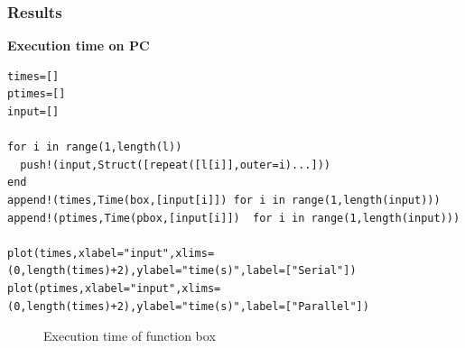 \documentclass[a4paper,12pt]{article}
\begin{document}
\subsubsection{Results}
\textbf{Execution time on PC}
\begin{Verbatim}[fontsize=\footnotesize]
times=[]
ptimes=[]
input=[]

for i in range(1,length(l))
  push!(input,Struct([repeat([l[i]],outer=i)...]))
end
append!(times,Time(box,[input[i]]) for i in range(1,length(input)))
append!(ptimes,Time(pbox,[input[i]])  for i in range(1,length(input)))

plot(times,xlabel="input",xlims=(0,length(times)+2),ylabel="time(s)",label=["Serial"])
plot(ptimes,xlabel="input",xlims=(0,length(times)+2),ylabel="time(s)",label=["Parallel"])
\end{Verbatim}
\begin{figure}[!h]
\centering
{}
\caption{Execution time of function box}
\end{figure}
\end{document}
